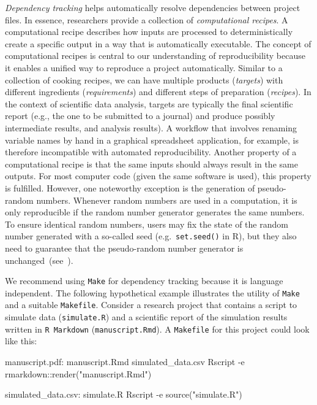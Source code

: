 \documentclass[psych,tutorial,accept,moreauthors,pdftex]{Definitions/mdpi}
\newenvironment{Shaded}{\begin{snugshade}}{\end{snugshade}}
\newcommand{\AttributeTok}[1]{\textcolor[rgb]{0.77,0.63,0.00}{#1}}
\newcommand{\ExtensionTok}[1]{#1}
\newcommand{\NormalTok}[1]{#1}
\newcommand{\StringTok}[1]{\textcolor[rgb]{0.31,0.60,0.02}{#1}}
\begin{document}
\emph{Dependency tracking} helps automatically resolve dependencies
between project files. In essence, researchers provide a collection of
\emph{computational recipes}. A computational recipe describes how
inputs are processed to deterministically create a specific output in a
way that is automatically executable. The concept of computational
recipes is central to our understanding of reproducibility because it
enables a unified way to reproduce a project automatically. Similar to a
collection of cooking recipes, we can have multiple products
(\emph{targets}) with different ingredients (\emph{requirements}) and
different steps of preparation (\emph{recipes}). In the context of
scientific data analysis, targets are typically the final scientific
report (e.g., the one to be submitted to a journal) and produce possibly
intermediate %
results, and analysis results). A workflow that involves renaming
variable names by hand in a graphical spreadsheet application, for
example, is therefore incompatible with automated reproducibility.
Another property of a computational recipe is that the same inputs
should always result in the same outputs. For most computer code (given
the same software is used), this property is fulfilled. However, one
noteworthy exception is the generation of pseudo-random numbers.
Whenever random numbers are used in a computation, it is only
reproducible if the random number generator generates the same numbers.
To ensure identical random numbers, users may fix the state of the
random number generated with a so-called seed (e.g.~\texttt{set.seed()}
in R), but they also need to guarantee that the pseudo-random number
generator is unchanged~(see~\citep{Peikert2019}).

We recommend using \texttt{Make} for dependency tracking because it is
language independent. The following hypothetical example illustrates the
utility of \texttt{Make} and a suitable \texttt{Makefile}. Consider a
research project that contains a script to simulate data
(\texttt{simulate.R}) and a scientific report of the simulation results
written in \texttt{R\ Markdown} (\texttt{manuscript.Rmd}). A
\texttt{Makefile} for this project could look like this:



\begin{adjustwidth}{0.5cm}{0cm} 
\begin{Shaded}
\begin{Highlighting}[]
\ExtensionTok{manuscript.pdf:}\NormalTok{ manuscript.Rmd simulated\_data.csv}
  \ExtensionTok{Rscript} \AttributeTok{{-}e} \StringTok{\textquotesingle{}rmarkdown::render("manuscript.Rmd")\textquotesingle{}}

\ExtensionTok{simulated\_data.csv:}\NormalTok{ simulate.R}
  \ExtensionTok{Rscript} \AttributeTok{{-}e} \StringTok{\textquotesingle{}source("simulate.R")\textquotesingle{}}
\end{Highlighting}
\end{Shaded}
\end{adjustwidth}
\end{document}
